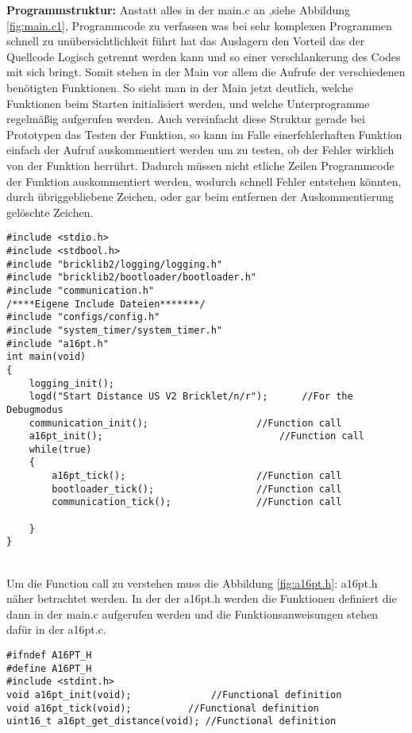 \textbf{Programmstruktur:}
Anstatt alles in der main.c an ,siehe Abbildung \ref{fig:main.c1}, Programmcode zu verfassen was bei sehr komplexen Programmen schnell zu unübersichtlichkeit führt hat das Auslagern den Vorteil das der Quellcode Logisch getrennt werden kann und so einer verschlankerung des Codes mit sich bringt. 
Somit stehen in der Main  vor allem die Aufrufe der verschiedenen benötigten Funktionen. So sieht man in der Main jetzt deutlich, welche Funktionen beim Starten initialisiert werden, und welche Unterprogramme regelmäßig aufgerufen werden. Auch vereinfacht diese Struktur gerade bei Prototypen das Testen der Funktion, so kann im Falle einerfehlerhaften Funktion einfach der Aufruf auskommentiert werden um zu testen, ob der Fehler wirklich von der Funktion herrührt. Dadurch müssen nicht etliche Zeilen Programmcode der Funktion auskommentiert werden, wodurch schnell Fehler entstehen könnten, durch übriggebliebene Zeichen, oder gar beim entfernen der Auskommentierung gelöschte Zeichen.\\
\begin{minipage}{1\textwidth}
\begin{lstlisting}
#include <stdio.h>
#include <stdbool.h>
#include "bricklib2/logging/logging.h"
#include "bricklib2/bootloader/bootloader.h"
#include "communication.h"
/****Eigene Include Dateien*******/
#include "configs/config.h"
#include "system_timer/system_timer.h"
#include "a16pt.h"
int main(void)
{ 
	logging_init(); 
	logd("Start Distance US V2 Bricklet/n/r");  	//For the Debugmodus
	communication_init(); 					//Function call
	a16pt_init(); 								//Function call	
	while(true)
	{
		a16pt_tick(); 						//Function call
		bootloader_tick(); 					//Function call
		communication_tick(); 				//Function call
		
	}
}
\end{lstlisting}
\label{fig:main.c1}
\end{minipage}\\
Um die Function call zu verstehen muss die Abbildung \ref{fig:a16pt.h}: a16pt.h näher betrachtet werden.
In der der a16pt.h werden die Funktionen definiert die dann in der main.c aufgerufen werden und die Funktionsanweisungen stehen dafür in der a16pt.c.\\
\begin{minipage}{1\textwidth}
\begin{lstlisting}
#ifndef A16PT_H
#define A16PT_H
#include <stdint.h>
void a16pt_init(void);				//Functional definition
void a16pt_tick(void); 			//Functional definition
uint16_t a16pt_get_distance(void); //Functional definition
\end{lstlisting}
\label{fig:a16pt.h}
\end{minipage}

